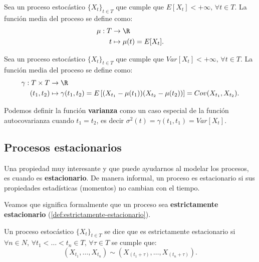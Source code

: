 \begin{definicion}
  Sea un proceso estocástico $\{X_t\}_{t \in T}$ que cumple que $E[X_t] < +\infty, \, \forall t \in T$. La función media del proceso se define como:
  $$\begin{aligned} \mu : T & \to \R \\
    t & \mapsto \mu(t) = E[X_t].
  \end{aligned}$$
  \label{def:func-media}
\end{definicion}

\begin{definicion}
  Sea un proceso estocástico $\{X_t\}_{t \in T}$ que cumple que $Var[X_t] < +\infty, \, \forall t \in T$. La función media del proceso se define como:
  $$\begin{aligned} \gamma : T \times T & \to \R \\
    (t_1, t_2) & \mapsto \gamma(t_1, t_2) = E\left[(X_{t_1} - \mu(t_1))(X_{t_2} - \mu(t_2))\right] = Cov(X_{t_1}, X_{t_2}).
  \end{aligned}$$
  \label{def:func-autocovarianza}
\end{definicion}

Podemos definir la función \textbf{varianza} como un caso especial de la función autocovarianza cuando $t_1 = t_2$, es decir $\sigma^2(t) = \gamma(t_1, t_1) = Var[X_t]$.

\subsection{Procesos estacionarios}

Una propiedad muy interesante y que puede ayudarnos al modelar los procesos, es cuando es \textbf{estacionario}. De manera informal, un proceso es estacionario si sus propiedades estadísticas (momentos) no cambian con el tiempo.

Veamos que significa formalmente que un proceso sea \textbf{estrictamente estacionario} (\autoref{def:estrictamente-estacionario}).

\begin{definicion}
  Un proceso estocástico $\{X_t\}_{t \in T}$ se dice que es estrictamente estacionario si $\forall n \in N$, $\forall t_1 < \ldots < t_n \in T$, $\forall \tau \in T$ se cumple que:
  $$\left( X_{t_1}, \ldots, X_{t_n}\right) \sim \left( X_{(t_1 + \tau)}, \ldots, X_{(t_n + \tau)}\right).$$
  \label{def:estrictamente-estacionario}
\end{definicion}

